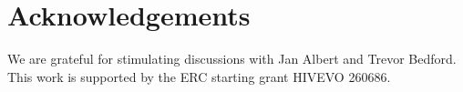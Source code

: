 \documentclass[rmp, twocolumn]{revtex4}
\begin{document}
\section*{Acknowledgements}
We are grateful for stimulating discussions with Jan Albert and Trevor Bedford.
This work is supported by the ERC starting grant HIVEVO 260686.



\end{document}
